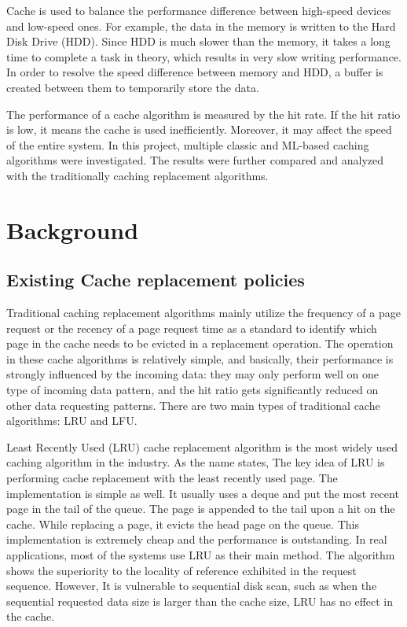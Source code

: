 \documentclass[letterpaper,twocolumn,10pt]{article}
\begin{document}
Cache is used to balance the performance difference between high-speed devices and low-speed ones. For example, the data in the memory is written to the Hard Disk Drive (HDD). Since HDD is much slower than the memory, it takes a long time to complete a task in theory, which results in very slow writing performance. In order to resolve the speed difference between memory and HDD, a buffer is created between them to temporarily store the data. 

The performance of a cache algorithm is measured by the hit rate. If the hit ratio is low, it means the cache is used inefficiently. Moreover, it may affect the speed of the entire system. In this project, multiple classic and ML-based caching algorithms were investigated. The results were further compared and analyzed with the traditionally caching replacement algorithms.

\section{Background}

\subsection{Existing Cache replacement policies}
Traditional caching replacement algorithms mainly utilize the frequency of a page request or the recency of a page request time as a standard to identify which page in the cache needs to be evicted in a replacement operation. The operation in these cache algorithms is relatively simple, and basically, their performance is strongly influenced by the incoming data: they may only perform well on one type of incoming data pattern, and the hit ratio gets significantly reduced on other data requesting patterns. There are two main types of traditional cache algorithms: LRU and LFU.

Least Recently Used (LRU) cache replacement algorithm is the most widely used caching algorithm in the industry. As the name states, The key idea of LRU is performing cache replacement with the least recently used page\cite{mattson1970evaluation}. The implementation is simple as well. It usually uses a deque\cite{WinNT} and put the most recent page in the tail of the queue. The page is appended to the tail upon a hit on the cache. While replacing a page, it evicts the head page on the queue. This implementation is extremely cheap and the performance is outstanding. In real applications, most of the systems use LRU as their main method. The algorithm shows the superiority to the locality of reference exhibited in the request sequence. However, It is vulnerable to sequential disk scan, such as when the sequential requested data size is larger than the cache size, LRU has no effect in the cache. 
\end{document}
